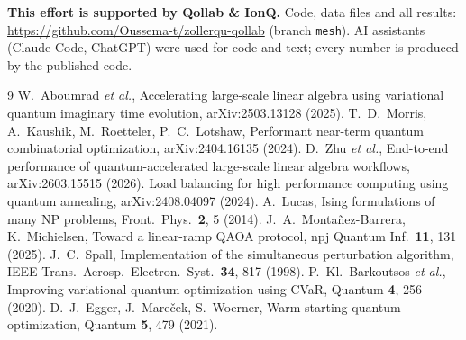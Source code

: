 \documentclass[10pt,twocolumn]{article}
\begin{document}
\noindent\textbf{This effort is supported by Qollab \& IonQ.} Code, data files and all results: \url{https://github.com/Oussema-t/zollerqu-qollab} (branch \texttt{mesh}). AI assistants (Claude Code, ChatGPT) were used for code and text; every number is produced by the published code.

{\footnotesize
\begin{thebibliography}{9}\setlength{\itemsep}{0pt}
 W.~Aboumrad \emph{et al.}, Accelerating large-scale linear algebra using variational quantum imaginary time evolution, arXiv:2503.13128 (2025).
 T.~D.~Morris, A.~Kaushik, M.~Roetteler, P.~C.~Lotshaw, Performant near-term quantum combinatorial optimization, arXiv:2404.16135 (2024).
 D.~Zhu \emph{et al.}, End-to-end performance of quantum-accelerated large-scale linear algebra workflows, arXiv:2603.15515 (2026).
 Load balancing for high performance computing using quantum annealing, arXiv:2408.04097 (2024).
 A.~Lucas, Ising formulations of many NP problems, Front.\ Phys.\ \textbf{2}, 5 (2014).
 J.~A.~Monta\~nez-Barrera, K.~Michielsen, Toward a linear-ramp QAOA protocol, npj Quantum Inf.\ \textbf{11}, 131 (2025).
 J.~C.~Spall, Implementation of the simultaneous perturbation algorithm, IEEE Trans.\ Aerosp.\ Electron.\ Syst.\ \textbf{34}, 817 (1998).
 P.~Kl.~Barkoutsos \emph{et al.}, Improving variational quantum optimization using CVaR, Quantum \textbf{4}, 256 (2020).
 D.~J.~Egger, J.~Mare\v{c}ek, S.~Woerner, Warm-starting quantum optimization, Quantum \textbf{5}, 479 (2021).
\end{thebibliography}}
\end{document}
